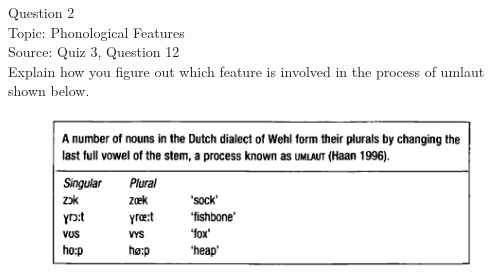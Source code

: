 \documentclass[12pt]{article}
\begin{document}
\newpage

{\large Question 2}\\

Topic: Phonological Features\\
Source: Quiz 3, Question 12\\

Explain how you figure out which feature is involved in the process of umlaut shown below.\\

\begin{figure}[H]
\includegraphics{../images/dutch.png}
\end{figure}

\newpage

\begin{center}
\textbf{{\color{red}{\HUGE END OF EXAM}}}\\

\end{center}
\newpage
\end{document}
